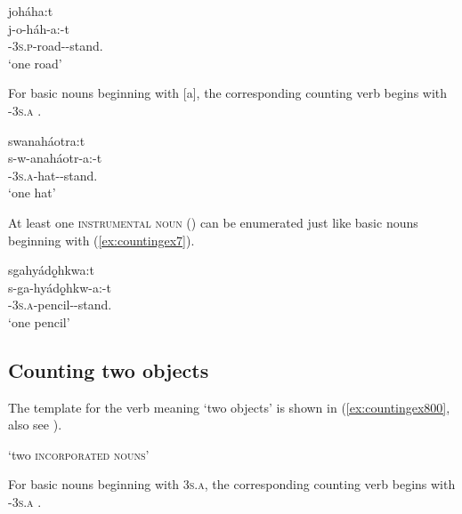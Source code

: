 \ea\label{ex:countingex5} 
joháha:t\\
\gll j-o-háh-a:-t\\
 {\repetitive}-\textsc{3s.p}-road-{\joinerA}-stand.{\stative}\\
\glt `one road'
\z


For basic nouns beginning with [a], the corresponding counting verb begins with  \textsc{\repetitive-3s.a} .

\newpage
\ea\label{ex:countingex6} 
swanaháotra:t\\
\gll s-w-anaháotr-a:-t\\
 {\repetitive}-\textsc{3s.a}-hat-{\joinerA}-stand.{\stative}\\
\glt `one hat'
\z


At least one \textsc{instrumental noun} () can be enumerated just like basic nouns beginning with  (\ref{ex:countingex7}).

\ea\label{ex:countingex7} 
sgahyádǫ̱hkwa:t\\
\gll s-ga-hyádǫ̱hkw-a:-t\\
 {\repetitive}-\textsc{3s.a}-pencil-{\joinerA}-stand.{\stative}\\
\glt `one pencil'
\z




\subsection{Counting two objects} \label{ch:Counting two objects}
The template for the verb meaning ‘two objects’ is shown in (\ref{ex:countingex800}, also see ).

\ea\label{ex:countingex800}  ‘two \textsc{incorporated nouns}’
\z

For basic nouns beginning with  \textsc{3s.a}, the corresponding counting verb begins with  \textsc{\dualic-3s.a} .

